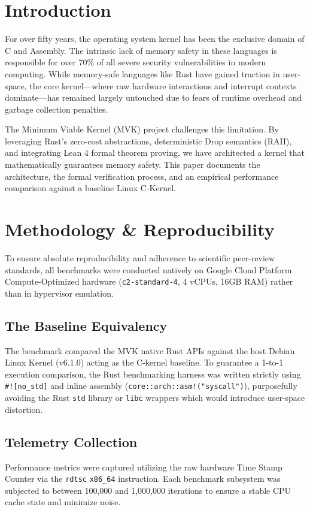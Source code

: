 \documentclass[sigconf]{acmart}
\begin{document}
\section{Introduction}
For over fifty years, the operating system kernel has been the exclusive domain of C and Assembly. The intrinsic lack of memory safety in these languages is responsible for over 70\% of all severe security vulnerabilities in modern computing. While memory-safe languages like Rust have gained traction in user-space, the core kernel---where raw hardware interactions and interrupt contexts dominate---has remained largely untouched due to fears of runtime overhead and garbage collection penalties.

The Minimum Viable Kernel (MVK) project challenges this limitation. By leveraging Rust's zero-cost abstractions, deterministic Drop semantics (RAII), and integrating Lean 4 formal theorem proving, we have architected a kernel that mathematically guarantees memory safety. This paper documents the architecture, the formal verification process, and an empirical performance comparison against a baseline Linux C-Kernel.

\section{Methodology \& Reproducibility}
To ensure absolute reproducibility and adherence to scientific peer-review standards, all benchmarks were conducted natively on Google Cloud Platform Compute-Optimized hardware (\texttt{c2-standard-4}, 4 vCPUs, 16GB RAM) rather than in hypervisor emulation.

\subsection{The Baseline Equivalency}
The benchmark compared the MVK native Rust APIs against the host Debian Linux Kernel (v6.1.0) acting as the C-kernel baseline. To guarantee a 1-to-1 execution comparison, the Rust benchmarking harness was written strictly using \texttt{\#![no\_std]} and inline assembly (\texttt{core::arch::asm!("syscall")}), purposefully avoiding the Rust \texttt{std} library or \texttt{libc} wrappers which would introduce user-space distortion.

\subsection{Telemetry Collection}
Performance metrics were captured utilizing the raw hardware Time Stamp Counter via the \texttt{rdtsc} \texttt{x86\_64} instruction. Each benchmark subsystem was subjected to between 100,000 and 1,000,000 iterations to ensure a stable CPU cache state and minimize noise.
\end{document}
